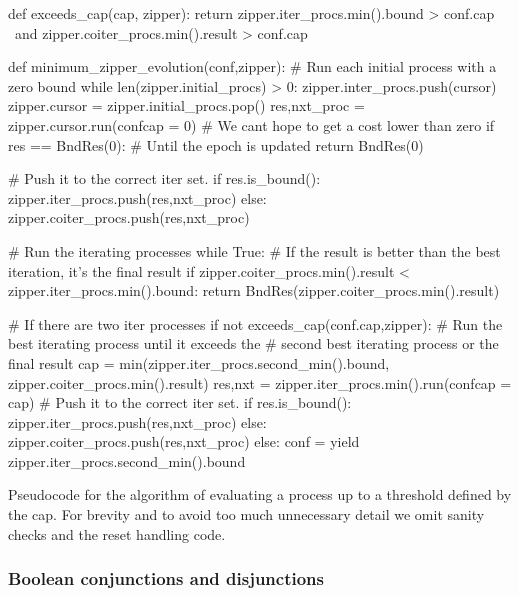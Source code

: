 \begin{code}
\begin{pycode}
def exceeds_cap(cap, zipper):
    return zipper.iter_procs.min().bound > conf.cap \
        and zipper.coiter_procs.min().result > conf.cap \


def minimum_zipper_evolution(conf,zipper):
    # Run each initial process with a zero bound
    while len(zipper.initial_procs) > 0:
        zipper.inter_procs.push(cursor)
        zipper.cursor = zipper.initial_procs.pop()
        res,nxt_proc = zipper.cursor.run(conf{cap = 0})
        # We cant hope to get a cost lower than zero
        if res == BndRes(0):
            # Until the epoch is updated
            return BndRes(0)

        # Push it to the correct iter set.
        if res.is_bound():
            zipper.iter_procs.push(res,nxt_proc)
        else:
            zipper.coiter_procs.push(res,nxt_proc)

    # Run the iterating processes
    while True:
        # If the result is better than the best iteration, it's the final result
        if zipper.coiter_procs.min().result < zipper.iter_procs.min().bound:
            return BndRes(zipper.coiter_procs.min().result)

        # If there are two iter processes
        if not exceeds_cap(conf.cap,zipper):
            # Run the best iterating process until it exceeds the
            # second best iterating process or the final result
            cap = min(zipper.iter_procs.second_min().bound,
                      zipper.coiter_procs.min().result)
            res,nxt =  zipper.iter_procs.min().run(conf{cap = cap})
            # Push it to the correct iter set.
            if res.is_bound():
                zipper.iter_procs.push(res,nxt_proc)
            else:
                zipper.coiter_procs.push(res,nxt_proc)
        else:
            conf = yield zipper.iter_procs.second_min().bound
\end{pycode}
\label{lst:min_zipper_evolution}
\caption{Pseudocode for the algorithm of evaluating a process up to a threshold defined by the cap. For brevity and to avoid too much unnecessary detail we omit sanity checks and the reset handling code.}
\end{code}

\subsubsection{Boolean conjunctions and disjunctions}

